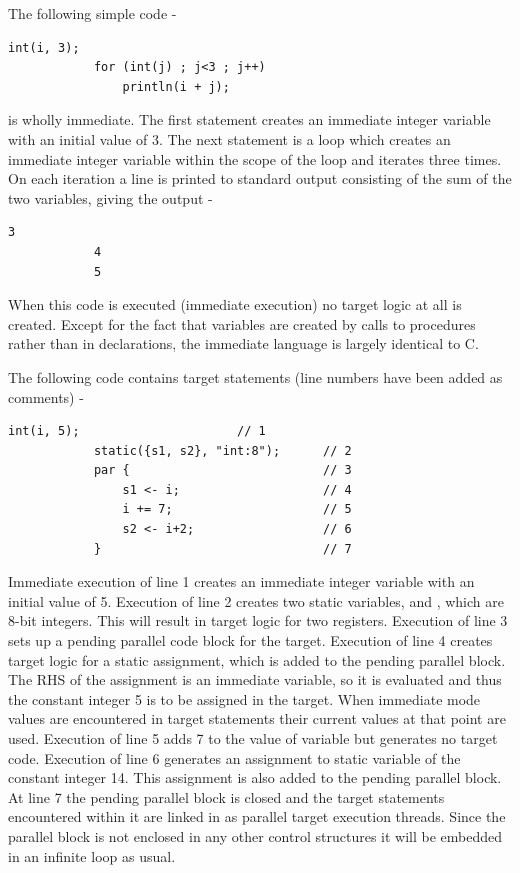         The following simple code -
        \begin{lstlisting}[language=threepl]
            int(i, 3);
            for (int(j) ; j<3 ; j++)
                println(i + j);
        \end{lstlisting}
        is wholly immediate. The first statement creates an immediate integer
        variable  with an initial value of 3. The next statement is a 
        loop which creates an immediate integer variable  within the scope
        of the loop and iterates three times. On each iteration a line is printed
        to standard output consisting of the sum of the two variables, giving the
        output -
        \begin{lstlisting}[language=threepl]
            3
            4
            5
        \end{lstlisting}
        When this code is executed (immediate execution) no target logic at all
        is created. Except for the fact that variables are created by calls to
        procedures rather than in declarations, the immediate language is largely
        identical to C.

        The following code contains target statements (line numbers have been added
        as comments) -
        \begin{lstlisting}[language=threepl]
            int(i, 5);                      // 1
            static({s1, s2}, "int:8");      // 2
            par {                           // 3
                s1 <- i;                    // 4
                i += 7;                     // 5
                s2 <- i+2;                  // 6
            }                               // 7
        \end{lstlisting}
        Immediate execution of line 1 creates an immediate integer variable 
        with an initial value of 5. Execution of line 2 creates two static
        variables,  and , which are 8-bit integers. This will result
        in target logic for two registers. Execution of line 3 sets up a pending
        parallel code block for the target. Execution of line 4 creates target logic
        for a static assignment, which is added to the pending parallel block. The
        RHS of the assignment is an immediate variable, so it is evaluated and thus
        the constant integer 5 is to be assigned in the target. When immediate mode
        values are encountered in target statements their current values at that
        point are used. Execution of line 5 adds 7 to the value of variable 
        but generates no target code. Execution of line 6 generates an assignment to
        static variable  of the constant integer 14. This assignment is also
        added to the pending parallel block. At line 7 the pending parallel block is
        closed and the target statements encountered within it are linked in as
        parallel target execution threads. Since the parallel block is not enclosed
        in any other control structures it will be embedded in an infinite loop as
        usual.

